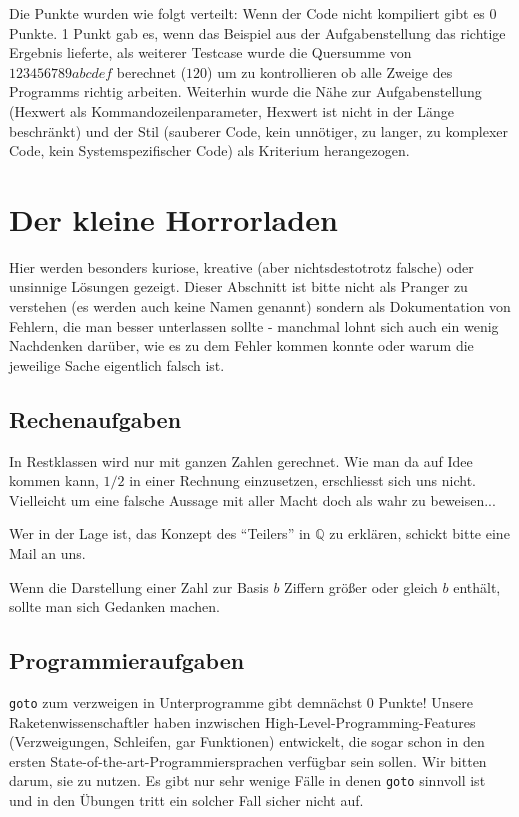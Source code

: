 \documentclass[%
	final, %
	normalheadings, %
	ngerman, %
	a4paper,
	1.1headlines, %
	pagesize, %
	halfparskip, %
	pointlessnumbers, %
	fleqn, %
]{scrartcl} %
\begin{document}
Die Punkte wurden wie folgt verteilt: Wenn der Code nicht kompiliert gibt es
0 Punkte. 1 Punkt gab es, wenn das Beispiel aus der Aufgabenstellung das
richtige Ergebnis lieferte, als weiterer Testcase wurde die Quersumme von 
$123456789abcdef$ berechnet ($120$) um zu kontrollieren ob alle Zweige des
Programms richtig arbeiten. Weiterhin wurde die Nähe zur Aufgabenstellung
(Hexwert als Kommandozeilenparameter, Hexwert ist nicht in der Länge
beschränkt) und der Stil (sauberer Code, kein unnötiger, zu langer, zu
komplexer Code, kein Systemspezifischer Code) als Kriterium herangezogen.


\section{Der kleine Horrorladen}
\label{wtf}

Hier werden besonders kuriose, kreative (aber nichtsdestotrotz falsche) oder 
unsinnige Lösungen gezeigt. Dieser Abschnitt ist bitte nicht als Pranger zu
verstehen (es werden auch keine Namen genannt) sondern als Dokumentation von
Fehlern, die man besser unterlassen sollte - manchmal lohnt sich auch ein wenig
Nachdenken darüber, wie es zu dem Fehler kommen konnte oder warum die jeweilige
Sache eigentlich falsch ist.

\subsection{Rechenaufgaben}

In Restklassen wird nur mit ganzen Zahlen gerechnet. Wie man da auf Idee kommen
kann, $1/2$ in einer Rechnung einzusetzen, erschliesst sich uns nicht. Vielleicht
um eine falsche Aussage mit aller Macht doch als wahr zu beweisen...

Wer in der Lage ist, das Konzept des ``Teilers'' in $\mathbb{Q}$ zu erklären,
schickt bitte eine Mail an uns.

Wenn die Darstellung einer Zahl zur Basis $b$ Ziffern größer oder gleich $b$
enthält, sollte man sich Gedanken machen.

\subsection{Programmieraufgaben}

\texttt{goto} zum verzweigen in Unterprogramme gibt demnächst 0 Punkte!
Unsere Raketenwissenschaftler haben inzwischen High-Level-Programming-Features
(Verzweigungen, Schleifen, gar Funktionen) entwickelt, die sogar schon in den
ersten State-of-the-art-Programmiersprachen verfügbar sein sollen. Wir bitten
darum, sie zu nutzen.
Es gibt nur sehr wenige Fälle in denen \texttt{goto} sinnvoll ist und in den
Übungen tritt ein solcher Fall sicher nicht auf.
\end{document}
